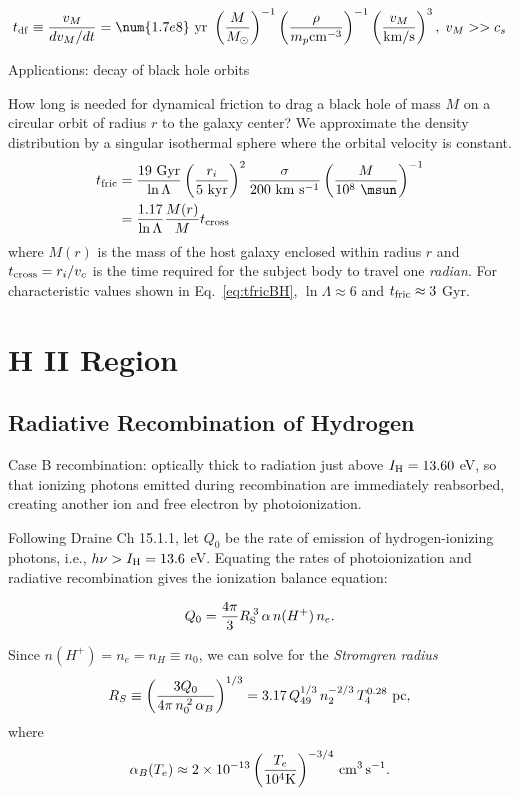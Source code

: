 \begin{equation}\label{}
  t_{\rm df} \equiv \frac{v_M}{dv_M/dt} = \num{1.7e8}~{\rm yr}~\left( \frac{M}{M_{\odot}} \right)^{-1} \left( \frac{\rho}{m_p {\rm cm}^{-3}}\right)^{-1} \left( \frac{v_M}{{\rm km/s}} \right)^{3}, \; v_M >> c_{s}
\end{equation}

Applications: decay of black hole orbits

How long is needed for dynamical friction to drag a black hole of mass $M$ on a circular orbit of radius $r$ to the galaxy center? We approximate the density distribution by a singular isothermal sphere where the orbital velocity is constant.
\begin{align}\label{}
  t_{\rm fric} &= \frac{19~{\rm Gyr}}{\ln \Lambda} \left( \frac{r_i}{5~{\rm kyr}} \right)^2 \frac{\sigma}{200~{\rm km~s^{-1}}} \left(\frac{M}{10^8~\msun}\right)^{-1} \label{eq:tfricBH}\\
  &= \frac{1.17}{\ln \Lambda} \frac{M(r)}{M} t_{\rm cross}
\end{align}
where $M(r)$ is the mass of the host galaxy enclosed within radius $r$ and $t_{\rm cross} = r_i/v_c$ is the time required for the subject body to travel one {\it radian}. For characteristic values shown in Eq.~\ref{eq:tfricBH}, $\ln \Lambda \approx 6$ and $t_{\rm fric} \approx 3$ Gyr.


\section{H II Region}
\label{sec:orgf10bcc5}
\subsection{Radiative Recombination of Hydrogen}
\label{sec:org0f9e007}
Case B recombination: optically thick to radiation just above \(I_{\rm H}=13.60\) eV, so that ionizing photons emitted during recombination are immediately reabsorbed, creating another ion and free electron by photoionization.

Following Draine Ch 15.1.1, let \(Q_{0}\) be the rate of emission of hydrogen-ionizing photons, i.e., \(h\nu>I_{{\rm H}}=13.6\) eV. Equating the rates of photoionization and radiative recombination gives the ionization balance equation:

$$Q_{0}=\frac{4\pi}{3}R_{{\rm S}}^{\;3}\,\alpha\,n(H^{+})\,n_{e}.$$

Since \(n(H^{+})=n_{e}=n_{H}\equiv n_{0}\), we can solve for the \emph{Stromgren radius} \citep[][Eq. 15.1 (pg 163)]{Draine:2011}
$$
\label{eq:rs}
  R_{S}\equiv\left(\frac{3Q_{0}}{4\pi\,n_{0}^{\;2}\,\alpha_{B}}\right)^{1/3} = 3.17 \, Q_{49}^{1/3} \, n_2^{-2/3} \, T_4^{0.28}~{\rm pc},
$$
where
$$
\alpha_B(T_e) \approx 2 \times 10^{-13} \left( \frac{T_e}{10^4 {\rm K}} \right)^{-3/4} \, {\rm cm}^3 \, {\rm s}^{-1}.
$$

